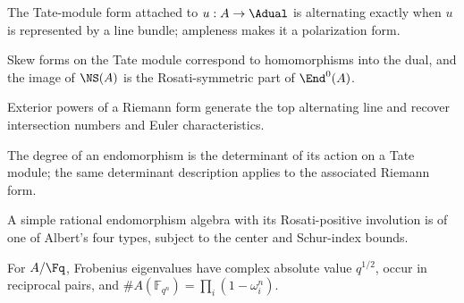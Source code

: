 \begin{theorem}
\label{mumford-iv20-riemann-form-skew}
The Tate-module form attached to $u:A\to\Adual$ is alternating exactly when
$u$ is represented by a line bundle; ampleness makes it a polarization form.
\notready
\end{theorem}

\begin{theorem}
\label{mumford-iv20-riemann-form-homomorphism-criterion}
Skew forms on the Tate module correspond to homomorphisms into the dual, and
the image of $\NS(A)$ is the Rosati-symmetric part of $\End^0(A)$.
\notready
\end{theorem}

\begin{theorem}
\label{mumford-iv20-riemann-wedge-generator}
Exterior powers of a Riemann form generate the top alternating line and recover
intersection numbers and Euler characteristics.
\notready
\end{theorem}

\begin{theorem}
\label{mumford-iv20-degree-determinant}
The degree of an endomorphism is the determinant of its action on a Tate module;
the same determinant description applies to the associated Riemann form.
\notready
\end{theorem}

\begin{theorem}
\label{mumford-iv21-albert-classification}
A simple rational endomorphism algebra with its Rosati-positive involution is
of one of Albert's four types, subject to the center and Schur-index bounds.
\notready
\end{theorem}

\begin{theorem}
\label{mumford-iv21-weil-rational-point-count}
For $A/\Fq$, Frobenius eigenvalues have complex absolute value $q^{1/2}$,
occur in reciprocal pairs, and
$\#A(\mathbb{F}_{q^n})=\prod_i(1-\omega_i^n)$.
\notready
\end{theorem}


